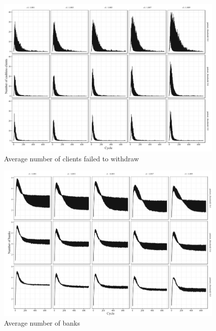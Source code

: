 \begin{frame}[plain]
    \begin{figure}
        \centering
        \includegraphics[width=\textwidth]{fig/fig4.jpeg}
        \caption{Average number of clients failed to withdraw}
        \label{fig:num_run}
    \end{figure}
\end{frame}

\begin{frame}[plain]
    \begin{figure}
        \centering
        \includegraphics[width=\textwidth]{fig/fig5.jpeg}
        \caption{Average number of banks}
        \label{fig:num_run}
    \end{figure}
\end{frame}

